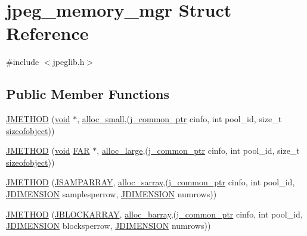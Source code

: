 \hypertarget{structjpeg__memory__mgr}{}\section{jpeg\+\_\+memory\+\_\+mgr Struct Reference}
\label{structjpeg__memory__mgr}


{\ttfamily \#include $<$jpeglib.\+h$>$}

\subsection*{Public Member Functions}
\begin{DoxyCompactItemize}
\item 
\hyperlink{structjpeg__memory__mgr_a9372ad24444dda23175cc9203105911c}{J\+M\+E\+T\+H\+O\+D} (\hyperlink{png_8h_aa8c59027f9ab2769342f248709d68d17}{void} $\ast$, \hyperlink{jmemmgr_8c_a6e4421c67636e6f167ced68315f70c2b}{alloc\+\_\+small},(\hyperlink{jpeglib_8h_a1a177ab705cefea8f30ec31a48e62650}{j\+\_\+common\+\_\+ptr} cinfo, int pool\+\_\+id, size\+\_\+t \hyperlink{jmemsys_8h_a473c898cf03a1563dc17fdafd08ddc30}{sizeofobject}))
\item 
\hyperlink{structjpeg__memory__mgr_a130f6dbc700cc045bdbe35beff2cb326}{J\+M\+E\+T\+H\+O\+D} (\hyperlink{png_8h_aa8c59027f9ab2769342f248709d68d17}{void} \hyperlink{jmorecfg_8h_aef060b3456fdcc093a7210a762d5f2ed}{F\+A\+R} $\ast$, \hyperlink{jmemmgr_8c_af69578de2938175b723191af0bf5b128}{alloc\+\_\+large},(\hyperlink{jpeglib_8h_a1a177ab705cefea8f30ec31a48e62650}{j\+\_\+common\+\_\+ptr} cinfo, int pool\+\_\+id, size\+\_\+t \hyperlink{jmemsys_8h_a473c898cf03a1563dc17fdafd08ddc30}{sizeofobject}))
\item 
\hyperlink{structjpeg__memory__mgr_a3fdd2e1dfdc089fd61f17b608c0263f2}{J\+M\+E\+T\+H\+O\+D} (\hyperlink{jpeglib_8h_ac9d5d1b829ed51769db69a37271a7e91}{J\+S\+A\+M\+P\+A\+R\+R\+A\+Y}, \hyperlink{jmemmgr_8c_a2f3c8a1efa7c23b98670fbdd351c5f41}{alloc\+\_\+sarray},(\hyperlink{jpeglib_8h_a1a177ab705cefea8f30ec31a48e62650}{j\+\_\+common\+\_\+ptr} cinfo, int pool\+\_\+id, \hyperlink{jmorecfg_8h_a04ed4674f6f1d0d50ec241531e38274f}{J\+D\+I\+M\+E\+N\+S\+I\+O\+N} samplesperrow, \hyperlink{jmorecfg_8h_a04ed4674f6f1d0d50ec241531e38274f}{J\+D\+I\+M\+E\+N\+S\+I\+O\+N} numrows))
\item 
\hyperlink{structjpeg__memory__mgr_aefc8abe884dab5648c1e4e7ada2e2e18}{J\+M\+E\+T\+H\+O\+D} (\hyperlink{jpeglib_8h_ab03cfeb937b60b9b73ca6e3cf935af49}{J\+B\+L\+O\+C\+K\+A\+R\+R\+A\+Y}, \hyperlink{jmemmgr_8c_afc851a6f36c0a1904c52ac8f06ab1928}{alloc\+\_\+barray},(\hyperlink{jpeglib_8h_a1a177ab705cefea8f30ec31a48e62650}{j\+\_\+common\+\_\+ptr} cinfo, int pool\+\_\+id, \hyperlink{jmorecfg_8h_a04ed4674f6f1d0d50ec241531e38274f}{J\+D\+I\+M\+E\+N\+S\+I\+O\+N} blocksperrow, \hyperlink{jmorecfg_8h_a04ed4674f6f1d0d50ec241531e38274f}{J\+D\+I\+M\+E\+N\+S\+I\+O\+N} numrows))

\end{DoxyCompactItemize}

